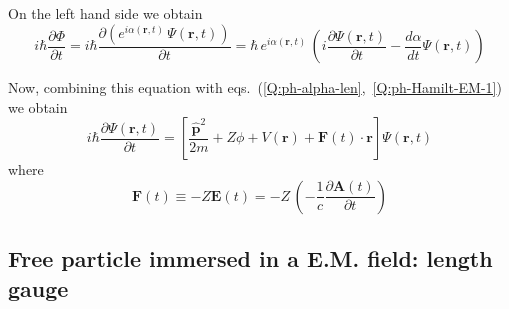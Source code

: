 On the left hand side we obtain
\begin{equation*}
  i \hbar \frac{\partial \Phi}{\partial t} = i \hbar \frac{\partial \left( e^{i \alpha(\bm{r},t)} \, \Psi(\bm{r},t) \right)}{\partial t} = \hbar \,  e^{i \alpha(\bm{r},t)}\, \left(  i \frac{\partial \Psi(\bm{r},t)}{\partial t} - \frac{d \alpha}{d t} \Psi(\bm{r},t) \right) 
\end{equation*}

Now, combining this equation with eqs.~(\ref{Q:ph-alpha-len},~\ref{Q:ph-Hamilt-EM-1}) we obtain
\begin{equation}
  \label{Q:ph-hamil-EM-force}
  i \hbar \frac{\partial \Psi(\bm{r},t)}{\partial t} = \left[ \frac{\hat{\bm{p}}^{2}}{2m} +  Z \phi +  V(\bm{r}) + \bm{F}(t) \cdot \bm{r} \right]  \Psi(\bm{r},t) 
\end{equation}
where
\begin{equation*}
  \bm{F}(t) \equiv - Z \bm{E}(t) = -Z\, \left(- \frac{1}{c} \frac{\partial \bm{A}(t)}{\partial t} \right)
\end{equation*}


\subsection{Free particle immersed in a E.M. field: length gauge}
\label{S:Free-parti-immer-E.M.-field}

